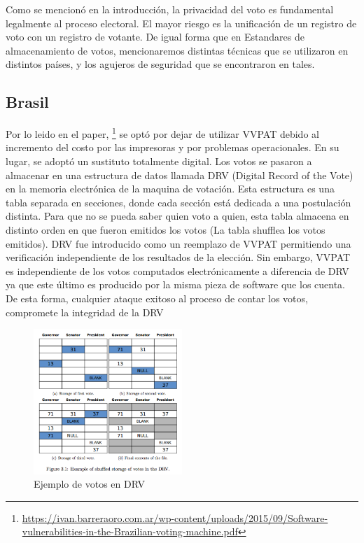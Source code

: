 Como se mencionó en la introducción, la privacidad del voto es fundamental legalmente al proceso electoral. El mayor riesgo es la unificación de un registro de voto con un registro de votante. 
De igual forma que en Estandares de almacenamiento de votos, mencionaremos distintas técnicas que se utilizaron en distintos países, y los agujeros de seguridad que se encontraron en tales.

\subsection{Brasil}
Por lo leido en el paper, 
\footnote{\url{https://ivan.barreraoro.com.ar/wp-content/uploads/2015/09/Software-vulnerabilities-in-the-Brazilian-voting-machine.pdf}}
se optó por dejar de utilizar VVPAT debido al incremento del costo por las impresoras y por problemas operacionales. En su lugar,  se adoptó un sustituto totalmente digital. Los votos se pasaron a almacenar en una estructura de datos llamada DRV (Digital Record of the Vote) en la memoria electrónica de la maquina de votación.  Esta estructura es una tabla separada en secciones, donde cada sección está dedicada a una postulación distinta. Para que no se pueda saber quien voto a quien, esta tabla almacena en distinto orden en que fueron emitidos los votos (La tabla shufflea los votos emitidos). 
DRV fue introducido como un reemplazo de VVPAT permitiendo una verificación independiente de los resultados de la elección.  Sin embargo, VVPAT es independiente de los votos computados electrónicamente a diferencia de DRV ya que este último es producido por la misma pieza de software que los cuenta. De esta forma, cualquier ataque exitoso al proceso de contar los votos, compromete la integridad de la DRV

\begin{figure}[h!]
\includegraphics[width=0.5\textwidth]{Imagenes/privacidad1}
\caption{Ejemplo de votos en DRV}
\end{figure}

